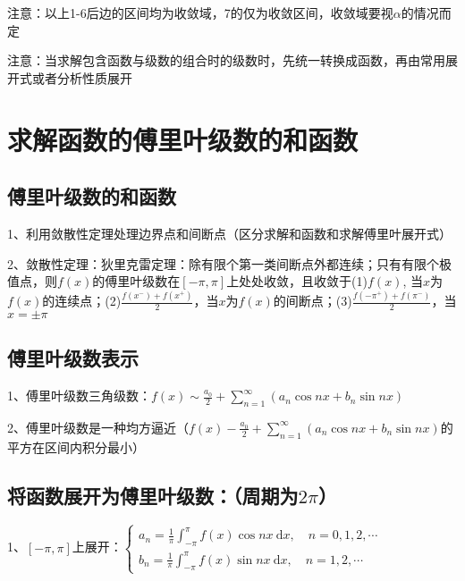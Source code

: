注意：以上1-6后边的区间均为收敛域，7的仅为收敛区间，收敛域要视$\alpha$的情况而定

注意：当求解包含函数与级数的组合时的级数时，先统一转换成函数，再由常用展开式或者分析性质展开

\section{求解函数的傅里叶级数的和函数}



\subsection{傅里叶级数的和函数}

1、利用敛散性定理处理边界点和间断点（区分求解和函数和求解傅里叶展开式）

2、敛散性定理：狄里克雷定理：除有限个第一类间断点外都连续；只有有限个极值点，则$f(x)$的傅里叶级数在$[-\pi, \pi]$上处处收敛，且收敛于(1)$f(x)$, 当$x$为$f(x)$的连续点；(2)$ \frac{f\left(x^{-}\right)+f\left(x^{+}\right)}{2}$，当$x$为$f(x)$的间断点；(3)$\frac{f\left(-\pi^{+}\right)+f\left(\pi^{-}\right)}{2}$，当$x=\pm \pi$



\subsection{傅里叶级数表示}

1、傅里叶级数三角级数：$f(x) \sim \frac{a_{0}}{2}+\sum_{n=1}^{\infty}\left(a_{n} \cos n x+b_{n} \sin n x\right)$

2、傅里叶级数是一种均方逼近（$f(x) - \frac{a_{0}}{2}+\sum_{n=1}^{\infty}\left(a_{n} \cos n x+b_{n} \sin n x\right)$的平方在区间内积分最小）



\subsection{将函数展开为傅里叶级数：（周期为$2\pi$）}

1、$[-\pi, \pi]$上展开：$\left\{\begin{array}{l}

a_{n}=\frac{1}{\pi} \int_{-\pi}^{\pi} f(x) \cos n x \mathrm{~d} x, \quad n=0,1,2, \cdots \\

b_{n}=\frac{1}{\pi} \int_{-\pi}^{\pi} f(x) \sin n x \mathrm{~d} x, \quad n=1,2, \cdots

\end{array}\right.$

